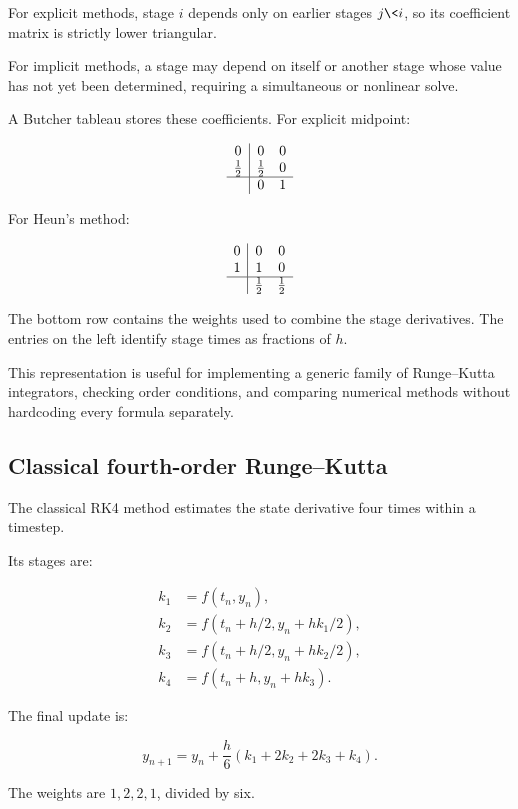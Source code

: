 For explicit methods, stage \(i\) depends only on earlier stages \(j\<i\), so its coefficient matrix is strictly lower triangular.

For implicit methods, a stage may depend on itself or another stage whose value has not yet been determined, requiring a simultaneous or nonlinear solve.

A Butcher tableau stores these coefficients. For explicit midpoint:

\[
\begin{array}{c|cc} 0&0&0\\ \frac12&\frac12&0\\ \hline &0&1 \end{array}
\]

For Heun's method:

\[
\begin{array}{c|cc} 0&0&0\\ 1&1&0\\ \hline &\frac12&\frac12 \end{array}
\]

The bottom row contains the weights used to combine the stage derivatives. The entries on the left identify stage times as fractions of \(h\).

This representation is useful for implementing a generic family of Runge--Kutta integrators, checking order conditions, and comparing numerical methods without hardcoding every formula separately.

\subsection{Classical fourth-order Runge--Kutta}\label{02-foundations-ii-ch025-classical-fourth-order-rungekutta}

The classical RK4 method estimates the state derivative four times within a timestep.

Its stages are:

\[
\boxed{ \begin{aligned} k_1&=f(t_n,y_n),\\ k_2&=f(t_n+h/2,y_n+hk_1/2),\\ k_3&=f(t_n+h/2,y_n+hk_2/2),\\ k_4&=f(t_n+h,y_n+hk_3). \end{aligned} }
\]

The final update is:

\[
\boxed{ y_{n+1} = y_n+\frac h6(k_1+2k_2+2k_3+k_4) }.
\]

The weights are \(1,2,2,1\), divided by six.

